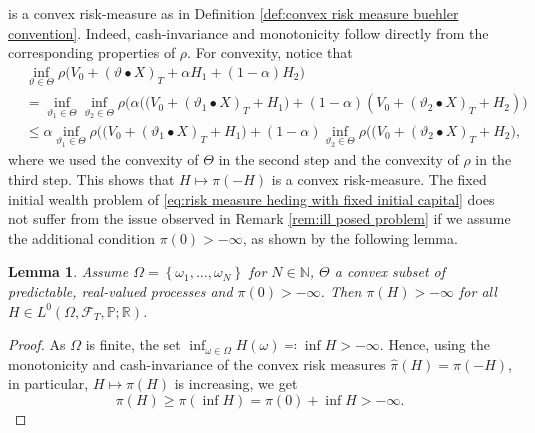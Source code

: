 \documentclass[11pt,a4paper,twoside,openany]{report}
\numberwithin{equation}{section}
\theoremstyle{plain} %
\newtheorem{lemma}[theorem]{Lemma}
\theoremstyle{definition} %
\theoremstyle{remark} %
\begin{document}
is a convex risk-measure as in Definition \ref{def:convex risk measure buehler convention}. Indeed, cash-invariance and monotonicity follow directly from the corresponding properties of \(\rho\). For convexity, notice that 
\begin{align*}
    &\inf_{\vartheta\in\Theta}\rho\big(V_0+(\vartheta\bullet X)_T+\alpha H_1+(1-\alpha) H_2\big)
    \\&=\inf_{\vartheta_1\in\Theta}\inf_{\vartheta_2\in\Theta}\rho\Big(\alpha\big((V_0+(\vartheta_1\bullet X)_T+H_1\big)+(1-\alpha) \left(V_0+(\vartheta_2\bullet X)_T+H_2\right)\Big)
    \\&\leq \alpha\inf_{\vartheta_1\in\Theta}\rho\big( (V_0+(\vartheta_1\bullet X)_T+H_1\big)+(1-\alpha)\inf_{\vartheta_2\in\Theta}\rho\big( (V_0+(\vartheta_2\bullet X)_T+H_2\big),
\end{align*}
 where we used the convexity of \(\Theta\) in the second step and the convexity of \(\rho\) in the third step. This shows that \(H\mapsto\pi(-H)\) is a convex risk-measure. The fixed initial wealth problem of \eqref{eq:risk measure heding with fixed initial capital} does not suffer from the issue observed in Remark \ref{rem:ill posed problem} if we assume the additional condition \(\pi(0)>-\infty\), as shown by the following lemma.


\begin{lemma}\label{lemma:Finiteness of inf for finite sample space}
    Assume \(\Omega = \left\{\omega_1,\dots,\omega_N\right\}\) for \(N\in\mathbb{N}\), \(\Theta\) a convex subset of predictable, real-valued processes and \(\pi(0)>-\infty\). Then \(\pi(H)>-\infty\) for all \(H\in L^0(\Omega,\mathcal{F}_T,\mathbb{P};\mathbb{R})\).
\end{lemma}
\begin{proof}
    As \(\Omega\) is finite, the set \(\inf_{\omega\in\Omega} H(\omega)\eqcolon\inf H>-\infty\). Hence, using the monotonicity and cash-invariance of the convex risk measures \(\hat{\pi}(H)=\pi(-H)\), in particular, \(H\mapsto \pi(H)\) is increasing, we get
    \begin{equation*}
        \pi(H)\geq\pi(\inf H)=\pi(0)+\inf H>-\infty.
    \end{equation*}
\end{proof}
\end{document}
